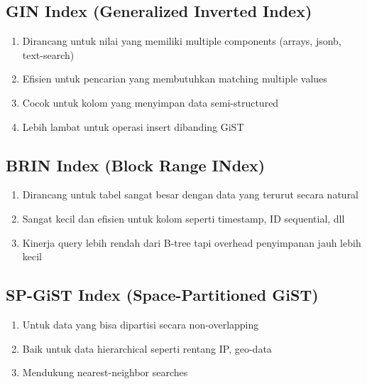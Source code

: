 \subsection{GIN Index (Generalized Inverted Index)}
\begin{enumerate}
    \item Dirancang untuk nilai yang memiliki multiple components (arrays, jsonb, text-search)
    \item Efisien untuk pencarian yang membutuhkan matching multiple values
    \item Cocok untuk kolom yang menyimpan data semi-structured
    \item Lebih lambat untuk operasi insert dibanding GiST
\end{enumerate}

\subsection{BRIN Index (Block Range INdex)}
\begin{enumerate}
    \item Dirancang untuk tabel sangat besar dengan data yang terurut secara natural
    \item Sangat kecil dan efisien untuk kolom seperti timestamp, ID sequential, dll
    \item Kinerja query lebih rendah dari B-tree tapi overhead penyimpanan jauh lebih kecil
\end{enumerate}

\subsection{SP-GiST Index (Space-Partitioned GiST)}
\begin{enumerate}
    \item Untuk data yang bisa dipartisi secara non-overlapping
    \item Baik untuk data hierarchical seperti rentang IP, geo-data
    \item Mendukung nearest-neighbor searches
\end{enumerate}


